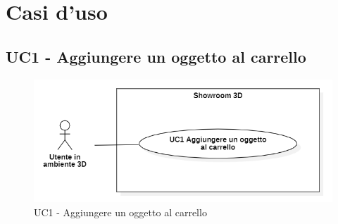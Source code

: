 \pagebreak

\section{Casi d'uso}

\subsection{UC1 - Aggiungere un oggetto al carrello}

\begin{figure}[H]
  \renewcommand{\thefigure}{1}
  \includegraphics[width=\linewidth]{./res/images/UC1.png}
  \caption{UC1 - Aggiungere un oggetto al carrello}
  \label{fig:UC 1}
\end{figure}

